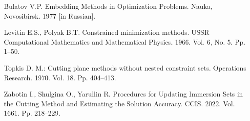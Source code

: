 \documentclass[12pt]{llncs}
\begin{document}
\begin{thebibliography}{9} %
 Bulatov V.P.  Embedding Methods in Optimization Problems. Nauka, Novosibirsk. 1977  [in Russian]. 
 
Levitin E.S., Polyak B.T.  Constrained minimization methods. USSR Computational Mathematics and Mathematical Physics. 1966. Vol. 6, No. 5. Pp. 1--50.

 Topkis D. M.: Cutting plane methods without nested constraint sets. Operations Research. 1970. Vol. {18}. Pp. 404--413.

Zabotin I., Shulgina O., Yarullin R. Procedures for Updating Immersion Sets in the Cutting Method and Estimating the Solution Accuracy. CCIS. 2022. Vol. {1661}. Pp. 218--229.

\end{thebibliography}
\end{document}
